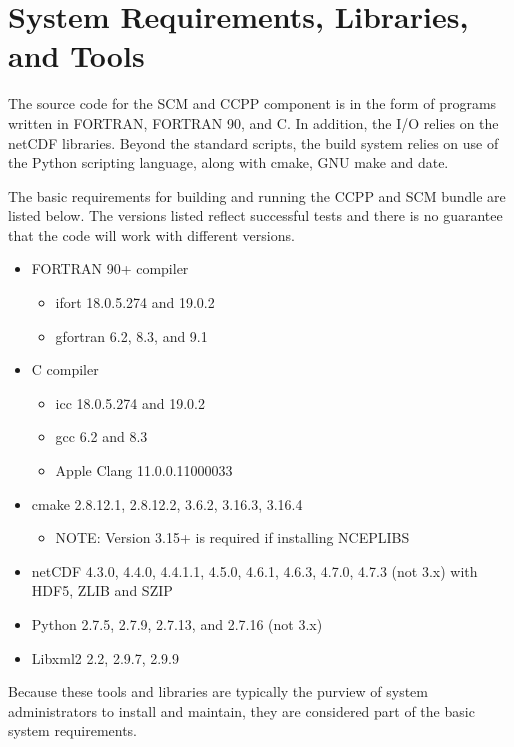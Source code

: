 \section{System Requirements, Libraries, and Tools}
\label{section: systemrequirements}

The source code for the SCM and CCPP component is in the form of programs written in FORTRAN, FORTRAN 90, and C. In addition, the I/O relies on the netCDF libraries. Beyond the standard scripts, the build system relies on use of the Python scripting language, along with cmake, GNU make and date.

The basic requirements for building and running the CCPP and SCM bundle are listed below. The versions listed reflect successful tests and there is no guarantee that the code will work with different versions.
\begin{itemize}
    \item FORTRAN 90+ compiler
    	\begin{itemize}
   	 \item ifort 18.0.5.274 and 19.0.2
	 \item gfortran 6.2, 8.3, and 9.1
	 \end{itemize}
    \item C compiler
    	\begin{itemize}
	\item icc 18.0.5.274 and 19.0.2
	\item gcc 6.2 and 8.3
	\item Apple Clang 11.0.0.11000033
	\end{itemize}
    \item cmake 2.8.12.1, 2.8.12.2, 3.6.2, 3.16.3, 3.16.4
    	\begin{itemize}
	\item NOTE: Version 3.15+ is required if installing NCEPLIBS
	\end{itemize}
   	 \item netCDF 4.3.0, 4.4.0, 4.4.1.1, 4.5.0, 4.6.1, 4.6.3, 4.7.0, 4.7.3 (not 3.x) with HDF5, ZLIB and SZIP
    \item Python 2.7.5, 2.7.9, 2.7.13, and 2.7.16 (not 3.x)
    \item Libxml2 2.2, 2.9.7, 2.9.9
\end{itemize}

Because these tools and libraries are typically the purview of system administrators to install and maintain, they are considered  part of the basic system requirements.

